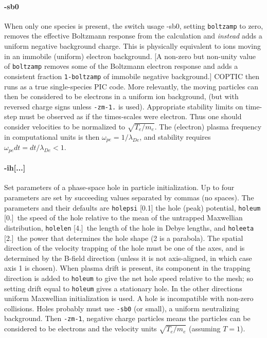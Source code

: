 \documentclass[12pt]{article}
\begin{document}
\paragraph{-sb0} When only one species is present, the switch usage
-sb0, setting \verb!boltzamp! to zero, removes the effective Boltzmann
response from the calculation and \emph{instead} adds a uniform
negative background charge. This is physically equivalent to ions
moving in an immobile (uniform) electron background. [A non-zero but
non-unity value of \verb!boltzamp! removes some of the Boltzmann
electron response and adds a consistent fraction \verb!1-boltzamp! of
immobile negative background.]  COPTIC then runs as a true
single-species PIC code. More relevantly, the moving
particles can then be considered to be electrons in a uniform ion
background, (but with reversed charge signs unless \verb!-zm-1.! is
used). Appropriate stability limits on time-step must be observed as
if the times-scales were electron. Thus one should consider
velocities to be normalized to $\sqrt{T_e/m_e}$. The (electron)
plasma frequency in computational units is then
$\omega_{pe}=1/\lambda_{De}$, and stability requires $\omega_{pe}dt =
dt/\lambda_{De}<1$. 

\paragraph{-ih[...]} Set parameters of a phase-space hole in particle
initialization. Up to four parameters are set by succeeding values
separated by commas (no spaces). The parameters and their defaults are
\verb!holepsi! [0.1] the hole (peak) potential, \verb!holeum! [0.]\
the speed of the hole relative to the mean of the untrapped Maxwellian
distribution, \verb!holelen! [4.]\ the length of the hole in Debye
lengths, and \verb!holeeta! [2.]\ the power that determines the hole
shape (2 is a parabola).  The spatial direction of the velocity
trapping of the hole must be one of the axes, and is determined by the
B-field direction (unless it is not axis-aligned, in which case axis 1
is chosen). When plasma drift is present, its component in the
trapping direction is added to \verb!holeum! to give the net hole
speed relative to the mesh; so setting drift equal to \verb!holeum!
gives a stationary hole.  In the other directions uniform Maxwellian
initialization is used. A hole is incompatible with non-zero
collisions. Holes probably must use \verb!-sb0! (or small), a uniform
neutralizing background. Then \verb!-zm-1!, negative charge particles
means the particles can be considered to be electrons and the velocity
units $\sqrt{T_e/m_e}$ (assuming $T=1$).
\end{document}
